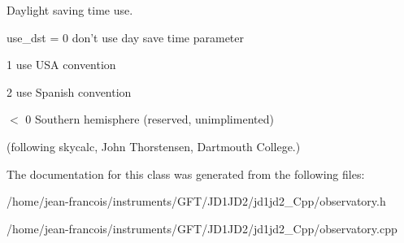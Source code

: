 Daylight saving time use. 

use\-\_\-dst = 0 don't use day save time parameter \par
 1 use U\-S\-A convention \par
 2 use Spanish convention \par
 $<$ 0 Southern hemisphere (reserved, unimplimented) \par
 (following skycalc, John Thorstensen, Dartmouth College.) 

The documentation for this class was generated from the following files\-:\begin{DoxyCompactItemize}
\item 
/home/jean-\/francois/instruments/\-G\-F\-T/\-J\-D1\-J\-D2/jd1jd2\-\_\-\-Cpp/observatory.\-h\item 
/home/jean-\/francois/instruments/\-G\-F\-T/\-J\-D1\-J\-D2/jd1jd2\-\_\-\-Cpp/observatory.\-cpp\end{DoxyCompactItemize}
